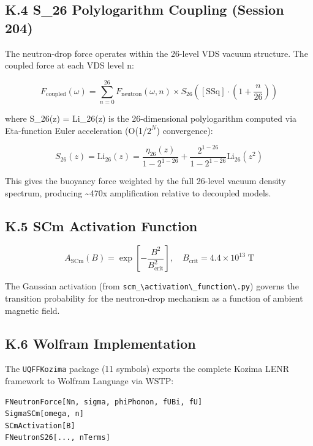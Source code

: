 \documentclass[12pt,a4paper]{article}
\begin{document}
\subsection{K.4 S\_26 Polylogarithm Coupling (Session 204)}

The neutron-drop force operates within the 26-level VDS vacuum structure. The coupled force at each VDS level n:

\begin{equation}
F_{\mathrm{coupled}}(\omega) = \sum_{n=0}^{26} F_{\mathrm{neutron}}(\omega, n) \times S_{26}\!\left([\text{SSq}] \cdot \left(1 + \frac{n}{26}\right)\right)
\end{equation}

where S\_26(z) = Li\_26(z) is the 26-dimensional polylogarithm computed via Eta-function Euler acceleration (O(1/$2^{N}$) convergence):

\begin{equation}
S_{26}(z) = \text{Li}_{26}(z) = \frac{\eta_{26}(z)}{1 - 2^{1-26}} + \frac{2^{1-26}}{1 - 2^{1-26}} \text{Li}_{26}(z^2)
\end{equation}

This gives the buoyancy force weighted by the full 26-level vacuum density spectrum, producing \textasciitilde{}470x amplification relative to decoupled models.

\subsection{K.5 SCm Activation Function}

\begin{equation}
A_{\mathrm{SCm}}(B) = \exp\!\left[-\frac{B^2}{B_{\mathrm{crit}}^2}\right], \quad B_{\mathrm{crit}} = 4.4 \times 10^{13} \;\text{T}
\end{equation}

The Gaussian activation (from \texttt{scm\_\textbackslash {activation\textbackslash \_function\textbackslash }.py}) governs the transition probability for the neutron-drop mechanism as a function of ambient magnetic field.

\subsection{K.6 Wolfram Implementation}

The \texttt{UQFFKozima} package (11 symbols) exports the complete Kozima LENR framework to Wolfram Language via WSTP:

\begin{verbatim}
FNeutronForce[Nn, sigma, phiPhonon, fUBi, fU]
SigmaSCm[omega, n]
SCmActivation[B]
FNeutronS26[..., nTerms]
\end{verbatim}
\end{document}
